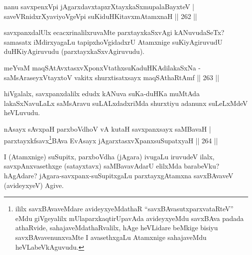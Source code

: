 
\begin{shl}
nanu savxpenxV\s pi jAgarxdavxtapxrXtayxkaSxmupalaBayxteV |\\
saveVRnidxrXyaviyoVgeV\s pi suKiduHKitavxmAtamxnaH \hfill || 262 ||
\end{shl}

\begin{artha}
savxpanxdalUlx ecacxrinalilxruvaMte parxtayxkaSxvAgi kANuvudaSeTx? samasatx iMdirxyagaLu tapipxhoVgidadxrU Atamxnige suKiyAgiruvudU duHKiyAgiruvudu (parxtayxkaSxvAgiruvudu).
\end{artha}


\begin{shl}
meYvaM maqSAtAvxtasxvXponxVtathxsuKaduHKAdilakaSxNa -\\
saMsAraseyxVtayxtoV vakitx shurxtisatxsayx maqSAthaRtAmf \hfill || 263 ||
\end{shl}

\begin{artha}
hiVgalalx, savxpanxdalilx edudx kANuva suKa-duHKa muMtAda lakaSxNavuLaLx saMsAravu suLALxdadxriMda shurxtiyu adanunx suLeLxMdeV heVLuvudu.
\end{artha}


\begin{shl}
nAsayx sAvxpaH parxboVdhoV vA kutaH savxpanxsayx saMBavaH |\\
parxtayxkfsavx\footnote{ililx savxBAvaveMdare avideyxyeMdathaR ``savxBAvasutxparxvataRteV'' eMdu giVgeyalilx mUlaparxkaqtirUpavAda avideyxyeMdu savxBAva padada athaRvide, sahajaveMdathaRvalilx, hAge heVLidare beMkige bisiyu savxBAvavenunxvaMte I avasethxgaLu Atamxnige sahajaveMdu heVLabeVkAguvudu.}BAva EvAsayx jAgarxtasxvXpanxsuSupatxyaH \hfill || 264 ||
\end{shl}

\begin{artha}
I (Atamxnige) suSupitx, parxboVdha (jAgara) ivugaLu iruvudeV ilalx, savxpAnxvasethxge (satayxtavx) saMBavavAdarU elilxMda barabeVku? hAgAdare? jAgara-savxpanx-suSupitxgaLu parxtayxgAtamxna savxBAvaveV (avideyxyeV) Agive.
\end{artha}



